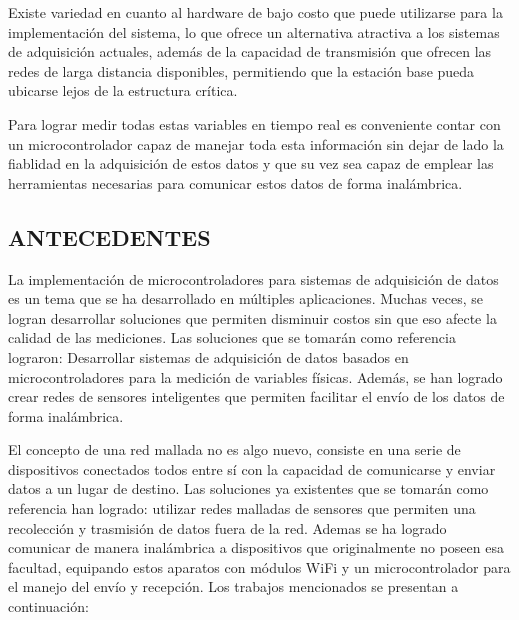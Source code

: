 \documentclass[12pt,letterpaper]{article}
\begin{document}
Existe variedad en cuanto al hardware de bajo costo que puede utilizarse para la implementación del sistema, lo que ofrece un alternativa atractiva a los sistemas de adquisición actuales, además de la capacidad de transmisión que ofrecen las redes de larga distancia disponibles, permitiendo que la estación base pueda ubicarse lejos de la estructura crítica.

Para lograr medir todas estas variables en tiempo real es conveniente contar con un microcontrolador capaz de manejar toda esta información sin dejar de lado la fiablidad en la adquisición de estos datos y que su vez sea capaz de emplear las herramientas necesarias para comunicar estos datos de forma inalámbrica.


 \newpage


 \begin{center}
 	\section*{ANTECEDENTES}
 \end{center}

\vspace{1cm}

La implementación de microcontroladores para sistemas de adquisición de datos es un tema que se ha desarrollado en múltiples aplicaciones. Muchas veces, se logran desarrollar soluciones que permiten disminuir costos sin que eso afecte la calidad de las mediciones. Las soluciones que se tomarán como referencia lograron: Desarrollar sistemas de adquisición de datos basados en microcontroladores para la medición de variables físicas. Además, se han logrado crear redes de sensores inteligentes que permiten facilitar el envío de los datos de forma inalámbrica.

El concepto de una red mallada no es algo nuevo, consiste en una serie de dispositivos conectados todos entre sí con la capacidad de comunicarse y enviar datos a un lugar de destino. Las soluciones ya existentes que se tomarán como referencia han logrado: utilizar redes malladas de sensores que permiten una recolección y trasmisión de datos fuera de la red. Ademas se ha logrado comunicar de manera inalámbrica a dispositivos que originalmente no poseen esa facultad, equipando estos aparatos con módulos WiFi y un microcontrolador para el manejo del envío y recepción. Los trabajos mencionados se presentan a continuación:\\
\end{document}
